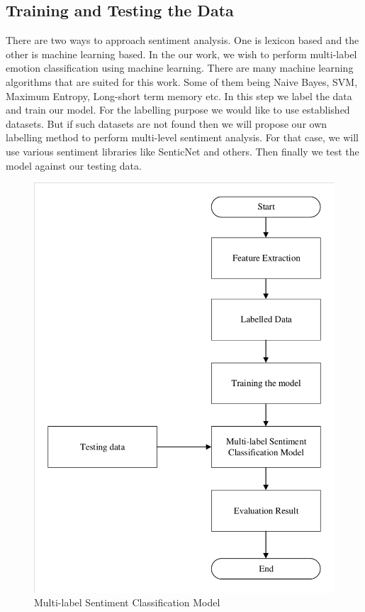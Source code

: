 \documentclass[12pt,a4paper]{article}
\begin{document}
\subsection*{Training and Testing the Data}
There are two ways to approach sentiment analysis. One is lexicon based and the other is machine learning based. In the our work, we wish to perform multi-label emotion classification using machine learning. There are many machine learning algorithms that are suited for this work. Some of them being Naive Bayes, SVM, Maximum Entropy, Long-short term memory etc. In this step we label the data and train our model. For the labelling purpose we would like to use established datasets. But if such datasets are not found then we will propose our own labelling method to perform multi-level sentiment analysis. For that case, we will use various sentiment libraries like SenticNet \cite{11} and others. Then finally we test the model against our testing data. 
\begin{figure}[H]
	\centering
	\includegraphics[scale=0.8]{3-1.pdf} \qquad
	\caption{Multi-label Sentiment Classification Model}
	\label{3}
\end{figure}
\end{document}
